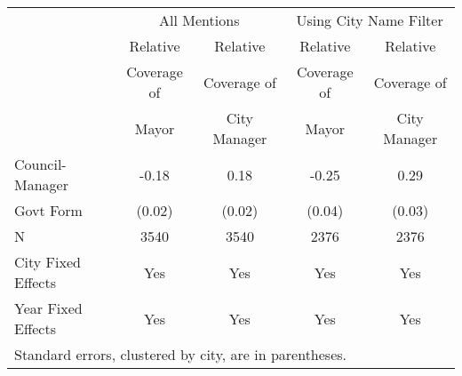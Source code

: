 %
\begin{tabular}{lcccc} 
\toprule \toprule 
 & \multicolumn{2}{c}{All Mentions} & \multicolumn{2}{c}{Using City Name Filter} \\[2mm] 
 & Relative    & Relative     & Relative    & Relative     \\ 
 & Coverage of & Coverage of  & Coverage of & Coverage of  \\ 
 & Mayor       & City Manager & Mayor       & City Manager \\ 
\midrule 
 Council-Manager  &  -0.18  &  0.18  &  -0.25  &  0.29  \\ 
 \quad Govt Form  & (0.02) & (0.02) & (0.04) & (0.03) \\[2mm] 
 N                &  3540  &  3540  &  2376  &  2376  \\[2mm] 
 City Fixed Effects & Yes & Yes & Yes & Yes \\
 Year Fixed Effects & Yes & Yes & Yes & Yes \\
\bottomrule \bottomrule 
\multicolumn{5}{p{.80\textwidth}}{Standard errors, clustered by city, are in parentheses.} \\ 
\end{tabular} 
%
